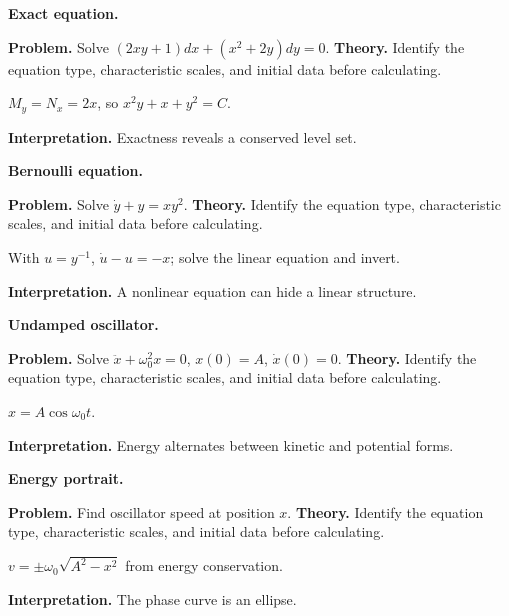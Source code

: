 \begin{workedexample}
\textbf{Exact equation.}\par
\textbf{Problem.} Solve $(2xy+1)dx+(x^2+2y)dy=0$.
\textbf{Theory.} Identify the equation type, characteristic scales, and initial data before calculating.
\begin{solution}
$M_y=N_x=2x$, so $x^2y+x+y^2=C$.

\textbf{Interpretation.} Exactness reveals a conserved level set.
\end{solution}
\end{workedexample}

\begin{workedexample}
\textbf{Bernoulli equation.}\par
\textbf{Problem.} Solve $\dot y+y=xy^2$.
\textbf{Theory.} Identify the equation type, characteristic scales, and initial data before calculating.
\begin{solution}
With $u=y^{-1}$, $\dot u-u=-x$; solve the linear equation and invert.

\textbf{Interpretation.} A nonlinear equation can hide a linear structure.
\end{solution}
\end{workedexample}

\begin{workedexample}
\textbf{Undamped oscillator.}\par
\textbf{Problem.} Solve $\ddot x+\omega_0^2x=0$, $x(0)=A$, $\dot x(0)=0$.
\textbf{Theory.} Identify the equation type, characteristic scales, and initial data before calculating.
\begin{solution}
$x=A\cos\omega_0t$.

\textbf{Interpretation.} Energy alternates between kinetic and potential forms.
\end{solution}
\end{workedexample}

\begin{workedexample}
\textbf{Energy portrait.}\par
\textbf{Problem.} Find oscillator speed at position $x$.
\textbf{Theory.} Identify the equation type, characteristic scales, and initial data before calculating.
\begin{solution}
$v=\pm\omega_0\sqrt{A^2-x^2}$ from energy conservation.

\textbf{Interpretation.} The phase curve is an ellipse.
\end{solution}
\end{workedexample}

